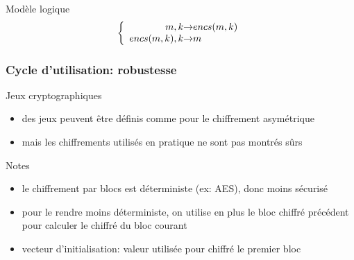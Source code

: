 \begin{reveals}
\begin{frame}
  \vfill

  \begin{block}{Modèle logique}
    \[
      \left\lbrace
        \begin{array}{r@{\ensuremath{\rightarrow}}l}
          m,k & encs(m,k)\\
          encs(m,k),k & m\\
        \end{array}
      \right.
    \]
  \end{block}

  \vfill


\end{frame}


\begin{frame}
  \frametitle{Cycle d'utilisation: robustesse}

  \vfill

  \begin{block}{Jeux cryptographiques}
     \begin{itemize}
     \item des jeux peuvent être définis comme pour le chiffrement asymétrique
     \item mais les chiffrements utilisés en pratique ne sont pas montrés sûrs
     \end{itemize}
  \end{block}

  \vfill

  \begin{block}{Notes}
    \begin{itemize}
    \item le chiffrement par blocs est déterministe (ex: AES), donc
      moins sécurisé
    \item pour le rendre moins déterministe, on utilise en plus le bloc
      chiffré précédent pour calculer le chiffré du bloc courant
    \item vecteur d'initialisation: valeur utilisée pour chiffré le premier bloc
    \end{itemize}
  \end{block}

  \vfill

\end{frame}






\end{reveals}

 
